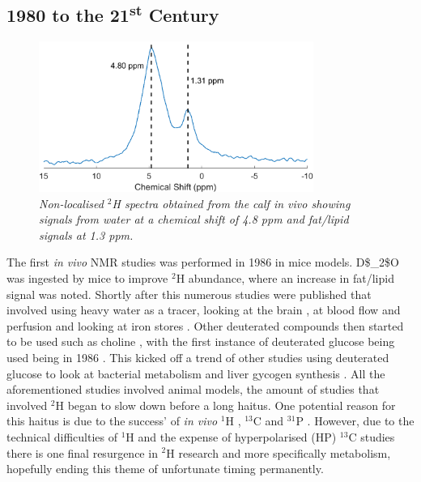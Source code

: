 \subsection{1980 to the 21\textsuperscript{st} Century}


\begin{figure}
    \centering
    \includegraphics[width=0.8\textwidth]{Figures/Intro/NA_Spectra.png}
    \caption{\textit{Non-localised $^2$H spectra obtained from the calf \textit{in vivo} showing signals from water at a chemical shift of 4.8 ppm and fat/lipid signals at 1.3 ppm.}}
    \label{fig:intro:NA}
\end{figure}

The first \textit{in vivo} NMR studies was performed in 1986 \cite{Brereton1986PreliminarySpectroscopy} in mice models. \Ac{D$_2$O} was ingested by mice to improve $^2$H abundance, where an increase in fat/lipid signal was noted. Shortly after this numerous studies were published that involved using heavy water as a tracer, looking at the brain \cite{Ewy1988DeuteriumSitu}, at blood flow and perfusion \cite{Ackerman1987DeuteriumTracer.} and looking at iron stores \cite{Irving1987InSpectroscopy}. Other deuterated compounds then started to be used such as choline \cite{Eng1990RenalStudy}, with the first instance of deuterated glucose being used being in 1986 \cite{Barrow1986NMRMobilis}. This kicked off a trend of other studies using deuterated glucose to look at bacterial metabolism \cite{Aguayo1988HighMetabolism.} and liver gycogen synthesis \cite{Goodman1989UseSynthesis}. All the aforementioned studies involved animal models, the amount of studies that involved $^2$H began to slow down before a long haitus. One potential reason for this haitus is due to the success' of \textit{in vivo} $^1$H \cite{Harada1984IdentificationScience}, $^{13}$C \cite{Cohen1980UseLiver} and $^{31}$P \cite{Sappey-Marinier1992EffectSpectroscopy}. However, due to the technical difficulties of $^1$H and the expense of hyperpolarised (HP) $^{13}$C studies there is one final resurgence in $^2$H research and more specifically metabolism, hopefully ending this theme of unfortunate timing permanently. 


